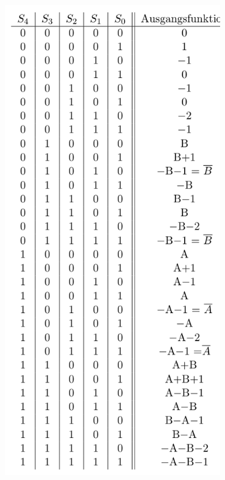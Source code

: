 \documentclass[10pt]{article}
\newenvironment{Figure}
  {\par\medskip\noindent\minipage{\linewidth}}
  {\endminipage\par\medskip}
\begin{document}
\begin{multicols}{2}
\begin{Figure}
		\centering\includegraphics[width=0.7\textwidth]{addier-subtrahierwek-befehle.png}
		\label{fig:add-sub-befehl}
	\end{Figure}
	\begin{Figure}

\end{Figure}
\end{multicols}
\end{document}
